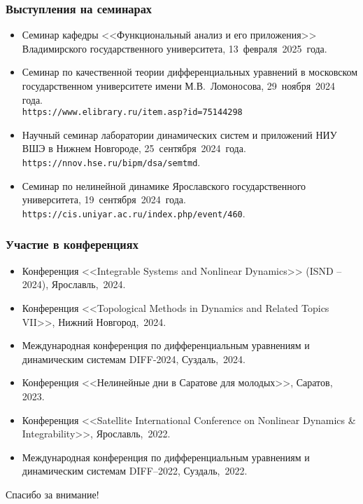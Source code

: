 \begin{frame}
    \frametitle{Выступления на семинарах}
    \begin{itemize}
    	\item Семинар кафедры <<Функциональный анализ и его приложения>> Владимирского государственного университета, 13~февраля~2025~года.
        \item Семинар по качественной теории дифференциальных уравнений в московском государственном университете имени М.В.~Ломоносова, 29~ноября~2024 года.\\\texttt{https://www.elibrary.ru/item.asp?id=75144298}
        \item Научный семинар лаборатории динамических систем и приложений НИУ ВШЭ в Нижнем Новгороде, 25~сентября~2024~года.\\\texttt{https://nnov.hse.ru/bipm/dsa/semtmd}.
        \item Семинар по нелинейной динамике Ярославского государственного университета, 19~сентября~2024~года.\\\texttt{https://cis.uniyar.ac.ru/index.php/event/460}.
    \end{itemize}
\end{frame}

\begin{frame}
	\frametitle{Участие в конференциях}
	\begin{itemize}
		\item Конференция <<Integrable Systems and Nonlinear Dynamics>> (ISND – 2024), Ярославль,~2024.
		\item Конференция <<Topological Methods in Dynamics and Related Topics VII>>, Нижний Новгород,~2024.
		\item Международная конференция по дифференциальным уравнениям и динамическим системам DIFF-2024, Суздаль,~2024.
		\item Конференция <<Нелинейные дни в Саратове для молодых>>, Саратов, 2023.
		\item Конференция <<Satellite International Conference on Nonlinear Dynamics {\&} Integrability>>, Ярославль,~2022.
		\item Международная конференция по дифференциальным уравнениям и динамическим системам DIFF--2022, Суздаль,~2022.
	\end{itemize}
\end{frame}

\begin{frame} %
    \begin{center}
        \Huge
        Спасибо за внимание!
    \end{center}
\end{frame}

